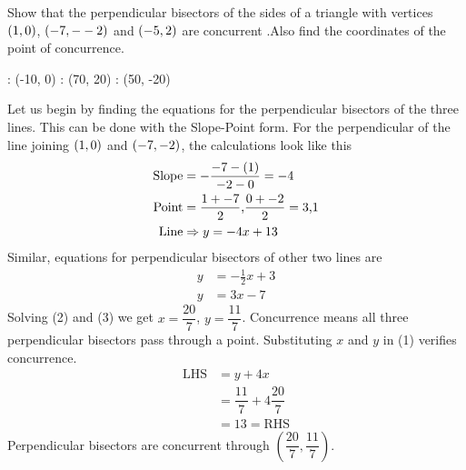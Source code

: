 \question[3] Show that the perpendicular bisectors of the sides of a triangle with vertices $(1 , 0 )$, $(-7 , --2)$ and $(-5 , 2 )$ are concurrent .Also find the coordinates of the point of concurrence.


\watchout

\ifprintanswers
  \begin{marginfigure}
      : (-10, 0)
      : (70, 20)
      : (50, -20)
    \figdrawbegin{}
      \figdrawline [10, 20]
      \figdrawline [20, 30]
      \figdrawline [30, 10]
    \figdrawend
    \centerline{\box\figBoxA}
  \end{marginfigure}
\fi 

\begin{solution}[\halfpage]
  Let us begin by finding the equations for the perpendicular bisectors 
  of the three lines. This can be done with the Slope-Point form.
  For the perpendicular of the line joining $(1, 0)$ and 
  $(-7, -2)$, the calculations look like this  
  \begin{align}
	\text{Slope} &= -\dfrac{-7 - (1)}
	    				   {-2 - 0} = -4  	   \nonumber \\
    \text{Point} &= \dfrac{1+-7}{2}\text{,}
    				\dfrac{0+-2}{2} = 3\text{,}1 \nonumber \\ 
    \text{Line}  &\Rightarrow y = -4x + 13
  \end{align}
  Similar, equations for perpendicular bisectors of other two lines are
  \begin{align}
  	y &= -\frac{1}{2}x + 3 \\
  	y &= 3x - 7
  \end{align}
  Solving (2) and (3) we get $x=\dfrac{20}{7}$, $y=\dfrac{11}{7}$.
  Concurrence means all three perpendicular bisectors pass through a point.
  Substituting $x$ and $y$ in (1) verifies concurrence.
  \begin{align}
  	\text{LHS} &= y + 4x \nonumber \\
  			   &= \dfrac{11}{7} + 4\dfrac{20}{7} \nonumber \\
  			   &= 13 = \text{RHS} \nonumber
  \end{align}
  Perpendicular bisectors are concurrent through 
  $(\dfrac{20}{7}, \dfrac{11}{7})$.
\end{solution}
